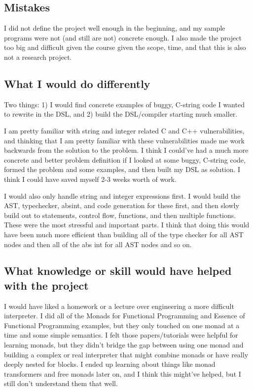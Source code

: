 \documentclass[letterpaper]{article}
\begin{document}
\subsection{Mistakes}

I did not define the project well enough in the beginning, and my sample programs
were not (and still are not) concrete enough. I also made the project too big and
difficult given the course given the scope, time, and that this is also not a
research project.


\subsection{What I would do differently}
Two things: 1) I would find concrete examples of buggy, C-string code I wanted
to rewrite in the DSL, and 2) build the DSL/compiler starting much smaller.

I am pretty familiar with string and integer related C and C++ vulnerabilities,
and thinking that I am pretty familiar with these vulnerabilities made me
work backwards from the solution to the problem. I think I could've had a much
more concrete and better problem definition if I looked at some buggy, C-string
code, formed the problem and some examples, and then built my DSL as solution.
I think I could have saved myself 2-3 weeks worth of work.

I would also only handle string and integer expressions first. I would build
the AST, typechecker, absint, and code generation for these first, and then
slowly build out to statements, control flow, functions, and then multiple
functions. These were the most stressful and important parts. I think that
doing this would have been much more efficient than building all of the
type checker for all AST nodes and then all of the abs int for all AST nodes
and so on.

\subsection{What knowledge or skill would have helped with the project}

I would have liked a homework or a lecture over engineering a more difficult
interpreter. I did all of the Monads for Functional Programming and Essence
of Functional Programming examples, but they only touched on one monad at a time
and some simple semantics. I felt those papers/tutorials were helpful for learning
monads, but they didn't bridge the gap between using one monad and building a complex
or real interpreter that might combine monads or have really deeply nested for blocks.
I ended up learning about things like monad transformers and free monads later on, and
I think this might've helped, but I still don't understand them that well.
\end{document}
